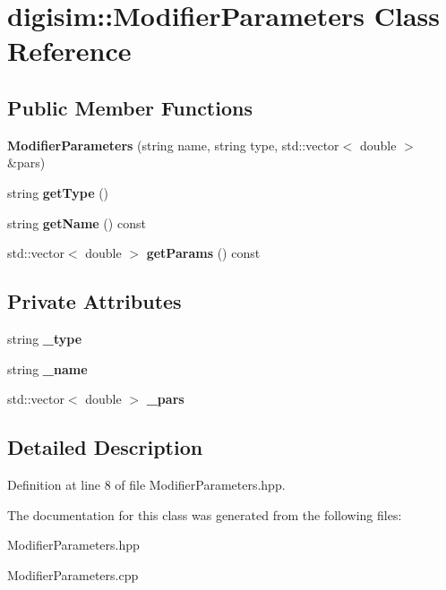 \section{digisim\-:\-:Modifier\-Parameters Class Reference}
\label{classdigisim_1_1ModifierParameters}
\subsection*{Public Member Functions}
\begin{DoxyCompactItemize}
\item 
{\bfseries Modifier\-Parameters} (string name, string type, std\-::vector$<$ double $>$ \&pars)\label{classdigisim_1_1ModifierParameters_a4f6673222e35d61fc40e4a1911a5caea}

\item 
string {\bfseries get\-Type} ()\label{classdigisim_1_1ModifierParameters_a6dc5ebb8704e042999487b5dfb65c27a}

\item 
string {\bfseries get\-Name} () const \label{classdigisim_1_1ModifierParameters_ae94aec54261b77a6d7d4d1d9e8b8dfd6}

\item 
std\-::vector$<$ double $>$ {\bfseries get\-Params} () const \label{classdigisim_1_1ModifierParameters_a9178dc1b98a0c6a7589660090189f5c2}

\end{DoxyCompactItemize}
\subsection*{Private Attributes}
\begin{DoxyCompactItemize}
\item 
string {\bfseries \-\_\-type}\label{classdigisim_1_1ModifierParameters_acf6fdae58913dedcc0f6292659336142}

\item 
string {\bfseries \-\_\-name}\label{classdigisim_1_1ModifierParameters_a5868b44745451ec4ed8f86cefa5d898d}

\item 
std\-::vector$<$ double $>$ {\bfseries \-\_\-pars}\label{classdigisim_1_1ModifierParameters_afbb62698d4fbdbc85654baa4b70d1b55}

\end{DoxyCompactItemize}


\subsection{Detailed Description}


Definition at line 8 of file Modifier\-Parameters.\-hpp.



The documentation for this class was generated from the following files\-:\begin{DoxyCompactItemize}
\item 
Modifier\-Parameters.\-hpp\item 
Modifier\-Parameters.\-cpp\end{DoxyCompactItemize}
